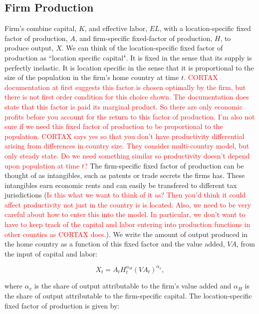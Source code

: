 \subsection{Firm Production}

Firm's combine capital, $K$, and effective labor, $EL$, with a location-specific fixed factor of production, $A$, and firm-specific fixed-factor of production, $H$, to produce output, $X$.  We can think of the location-specific fixed factor of production as ``location specific capital".  It is fixed in the sense that its supply is perfectly inelastic.  It is location specific in the sense that it is proportional to the size of the population in the firm's home country at time $t$. \textcolor{red}{CORTAX documentation at first suggests this factor is chosen optimally by the firm, but there is not first order condition for this choice shown.  The documentation does state that this factor is paid its marginal product.  So there are only economic profits before you account for the return to this factor of production.  I'm also not sure if we need this fixed factor of production to be proportional to the population.  CORTAX says yes so that you don't have productivity differential arising from differences in country size.  They consider multi-country model, but only steady state.  Do we need something similar so productivity doesn't depend upon population at time $t$?}  The firm-specific fixed factor of production can be thought of as intangibles, such as patents or trade secrets the firms has.  These intangibles earn economic rents and can easily be transfered to different tax jurisdictions (\textcolor{red}{Is this what we want to think of it as?  Then you'd think it could affect productivity not just in the country is is located.  Also, we need to be very careful about how to enter this into the model.  In particular, we don't want to have to keep track of the capital and labor entering into production functions in other counties as CORTAX does.}).  We write the amount of output produced in the home country as a function of this fixed factor and the value added, $VA$, from the input of capital and labor:

\begin{equation}
X_{t} = A_{t}H_{t}^{\alpha_{H}}(VA_{t})^{\alpha_{v}},
\end{equation} 

\noindent\noindent where $\alpha_{v}$ is the share of output attributable to the firm's value added and $\alpha_{H}$ is the share of output attributable to the firm-specific capital. The location-specific fixed factor of production is given by:

